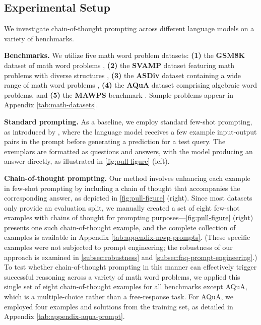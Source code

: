 \subsection{Experimental Setup}

We investigate chain-of-thought prompting across different language models on a variety of benchmarks.

\textbf{Benchmarks.} We utilize five math word problem datasets:
\textbf{(1)} the \textbf{GSM8K} dataset of math word problems \citep{cobbe2021training},
\textbf{(2)} the \textbf{SVAMP} dataset featuring math problems with diverse structures \citep{patel-etal-2021-nlp},
\textbf{(3)} the \textbf{ASDiv} dataset containing a wide range of math word problems \citep{miao-etal-2020-diverse},
\textbf{(4)} the \textbf{AQuA} dataset comprising algebraic word problems, and
\textbf{(5)} the \textbf{MAWPS} benchmark \citep{koncel-kedziorski-etal-2016-mawps}. Sample problems appear in Appendix \cref{tab:math-datasets}.

\textbf{Standard prompting.} As a baseline, we employ standard few-shot prompting, as introduced by \citet{brown2020language}, where the language model receives a few example input-output pairs in the prompt before generating a prediction for a test query. The exemplars are formatted as questions and answers, with the model producing an answer directly, as illustrated in \cref{fig:pull-figure} (left).

\textbf{Chain-of-thought prompting.} Our method involves enhancing each example in few-shot prompting by including a chain of thought that accompanies the corresponding answer, as depicted in \cref{fig:pull-figure} (right). Since most datasets only provide an evaluation split, we manually created a set of eight few-shot examples with chains of thought for prompting purposes—\cref{fig:pull-figure} (right) presents one such chain-of-thought example, and the complete collection of examples is available in Appendix \cref{tab:appendix-mwp-prompts}.  
(These specific examples were not subjected to prompt engineering; the robustness of our approach is examined in \cref{subsec:robustness} and \cref{subsec:faq-prompt-engineering}.)  
To test whether chain-of-thought prompting in this manner can effectively trigger successful reasoning across a variety of math word problems, we applied this single set of eight chain-of-thought examples for all benchmarks except AQuA, which is a multiple-choice rather than a free-response task. For AQuA, we employed four examples and solutions from the training set, as detailed in Appendix \cref{tab:appendix-aqua-prompt}.

